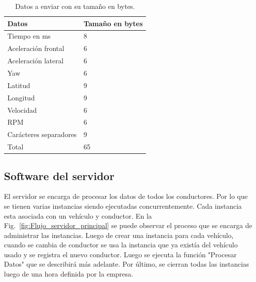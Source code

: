 \bgroup
\def\arraystretch{1}%
\begin{table}[htbp!]
\centering
\caption[Datos a enviar con su tamaño en bytes]{Datos a enviar con su tamaño en bytes.}
\begin{tabular}{ll}
\toprule
Datos & Tamaño en bytes \\ \midrule
Tiempo en ms & 8 \\
Aceleración frontal & 6 \\
Aceleración lateral & 6 \\
Yaw & 6 \\
Latitud & 9 \\
Longitud & 9 \\
Velocidad & 6 \\
RPM & 6 \\
Carácteres separadores & 9 \\ \midrule
Total & 65 \\ \bottomrule
\end{tabular}
\label{diag:datos_enviar}
\end{table}
\egroup


\subsection{Software del servidor}

El servidor se encarga de procesar los datos de todos los conductores. Por lo que se tienen varias instancias siendo ejecutadas concurrentemente. Cada instancia esta asociada con un vehículo y conductor. En la Fig.~\ref{fig:Flujo_servidor_principal} se puede observar el proceso que se encarga de administrar las instancias. Luego de crear una instancia para cada vehículo, cuando se cambia de conductor se usa la instancia que ya existía del vehículo usado y se registra el nuevo conductor. Luego se ejecuta la función "Procesar Datos" que se describirá más adelante. Por último, se cierran todas las instancias luego de una hora definida por la empresa.

